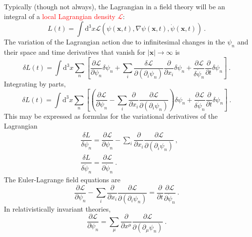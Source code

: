 \documentclass[11pt,a4paper]{article}
\renewcommand{\vec}[1]{\boldsymbol{#1}}
\newcommand{\dif}{\mathrm{d}}
\newcounter{theo}[section]\setcounter{theo}{0}
\begin{document}
Typically (though not always), the Lagrangian in a field theory will be an integral of a \textcolor{red}{local Lagrangian density $\mathcal L$}:
\begin{equation}
L(t) = \int \dif^3 x \mathcal L \left(\psi(\vec{x},t), \nabla \psi(\vec{x},t), \dot{\psi}(\vec{x},t) \right) ~.
\end{equation}
The variation of the Lagrangian action due to infinitesimal changes in the $\psi_n$ and their space and time derivatives that vanish for $|\vec{x}| \rightarrow \infty$ is
\begin{equation*}
\delta L(t) = \int \dif^3 x \sum_n \left[\dfrac{\partial \mathcal L}{\partial \psi_n} \delta \psi_n +\sum_i \dfrac{\delta \mathcal L}{\partial (\partial_i \psi_n)} \dfrac{\partial}{\partial x_i}\delta \psi_n + \dfrac{\partial \mathcal L}{\delta \dot{\psi}_n} \dfrac{\partial}{\partial t} \delta \psi_n   \right] ~.
\end{equation*}
Integrating by parts, 
\begin{equation}
\delta L(t) = \int \dif^3 x \sum_n \left[\left( \dfrac{\partial \mathcal L}{\partial \psi_n} -\sum_i \dfrac{\partial}{\partial x_i} \dfrac{\partial \mathcal L}{\partial (\partial_i \psi_n)} \right) \delta \psi_n + \dfrac{\partial \mathcal L}{\delta \dot{\psi}_n} \dfrac{\partial}{\partial t} \delta \psi_n   \right] ~.
\end{equation}
This may be expressed as formulas for the variational derivatives of the Lagrangian
\begin{align}
& \dfrac{\delta L}{\delta \psi_n} = \dfrac{\partial \mathcal L}{\partial \psi_n} -\sum_i \dfrac{\partial}{\partial x_i} \dfrac{\partial \mathcal L}{\partial (\partial_i \psi_n)} ~, \\
& \dfrac{\delta L}{\delta \dot{\psi}_n} = \dfrac{\partial \mathcal L}{\partial \dot{\psi}_n} ~.
\end{align}
The Euler-Lagrange field equations are
\begin{equation}
\dfrac{\partial \mathcal L}{\partial \psi_n} -\sum_i \dfrac{\partial}{\partial x_i} \dfrac{\partial \mathcal L}{\partial (\partial_i \psi_n)} = \dfrac{\partial}{\partial t}\dfrac{\partial \mathcal L}{\partial \dot{\psi}_n} ~.
\end{equation}
In relativistically invariant theories,
\begin{equation}
\dfrac{\partial \mathcal L}{\partial \psi_n} = \sum_\mu \dfrac{\partial}{\partial x^\mu}\dfrac{\partial \mathcal L}{\partial (\partial_\mu \psi_n)} ~.
\end{equation}
\end{document}
